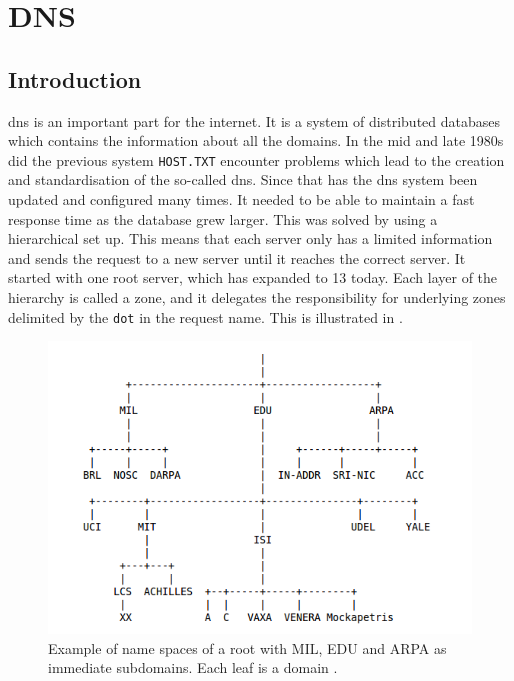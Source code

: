 \chapter{DNS}
\label{chp:dns}

\section{Introduction}

\gls{dns} is an important part for the internet. It is a system of distributed databases which contains the information about all the domains. In the mid and late 1980s did the previous system \texttt{HOST.TXT} encounter problems \cite{Mockapetris:1988:DDN:52324.52338} which lead to the creation and standardisation of the so-called \gls{dns}. Since that has the \Gls{dns} system been updated and configured many times. It needed to be able to maintain a fast response time as the database grew larger. This was solved by using a hierarchical set up. This means that each server only has a limited information and sends the request to a new server until it reaches the correct server. It started with one root server, which has expanded to 13 today. Each layer of the hierarchy is called a zone, and it delegates the responsibility for underlying zones delimited by the \texttt{dot} in the request name. This is illustrated in .

\begin{figure}
\centering
\includegraphics[scale=0.5]{figs/namespace_example.png}
\caption{\label{fig:namespace}Example of name spaces of a root with MIL, EDU and ARPA as immediate subdomains. Each leaf is a domain \citep{mockapetris1987domain}.}
\end{figure}



